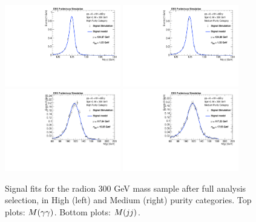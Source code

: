 \begin{figure}[h]
  \centering
  \includegraphics[width=0.45\textwidth]{figures/sec-signals/Rad300_signal_fit_mgg_cat0}\hfil
  \includegraphics[width=0.45\textwidth]{figures/sec-signals/Rad300_signal_fit_mgg_cat1}\hfil
  \includegraphics[width=0.45\textwidth]{figures/sec-signals/Rad300_signal_fit_mjj_cat0}\hfil
  \includegraphics[width=0.45\textwidth]{figures/sec-signals/Rad300_signal_fit_mjj_cat1}\hfil
  \caption{Signal fits for the radion 300 GeV mass sample after full analysis selection, in High (left) and Medium (right) purity categories. Top plots: $M(\gamma\gamma)$. Bottom plots: $M(jj)$.}
  \label{fig:rad300}
\end{figure}




